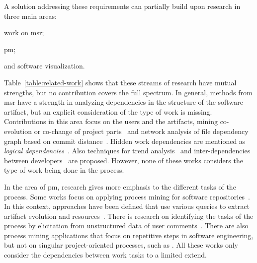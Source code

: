 A solution addressing these requirements can partially build upon research in three main areas:
\begin{inparaenum}[\itshape i)]
	\item work on \gls{msr};
	\item \gls{pm};
	\item and software visualization.
\end{inparaenum}



Table~\ref{table:related-work} shows that these streams of research have mutual strengths, but no contribution covers the full spectrum. In general, methods from \gls{msr} have a strength in analyzing dependencies in the structure of the software artifact, but an explicit consideration of the type of work is missing. Contributions in this area focus on the users and the artifacts, mining co-evolution or co-change of project parts~\cite{zaidman2008mining,DAmbros2009} and network analysis of file dependency graph based on commit distance~\cite{Zimmermann2008,Abate2009,Weicheng2013}. Hidden work dependencies are mentioned as \emph{logical dependencies}~\cite{Oliva2011}. Also techniques for trend analysis~\cite{Ruohonen2015} and inter-dependencies between developers~\cite{lindberg2016coordinating} are proposed. However, none of these works considers the type of work being done in the process.

In the area of \gls{pm}, research gives more emphasis to the different tasks of the process. Some works focus on applying process mining for software repositories~\cite{Poncin2011a,Mittal2014,Bala2015}. In this context, approaches have been defined that use various queries to extract artifact evolution and resources~\cite{Beheshti2016,Beheshti2013}. There is research on identifying the tasks of the process by elicitation from unstructured data of user comments~\cite{Goncalves2011}. There are also process mining applications that focus on repetitive steps in software engineering, but not on singular project-oriented processes, such as \cite{Kindler2006}. All these works only consider the dependencies between work tasks to a limited extend.


